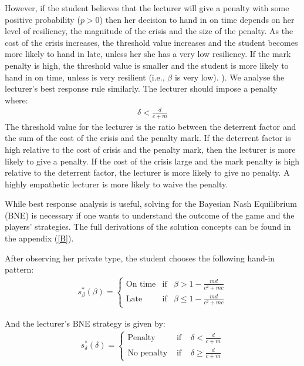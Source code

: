 \documentclass[11pt,preprint, authoryear]{elsarticle}
\numberwithin{equation}{section}
\numberwithin{figure}{section}
\numberwithin{table}{section}
\begin{document}
However, if the student believes that the lecturer will give a penalty
with some positive probability (\(p>0\)) then her decision to hand in on
time depends on her level of resiliency, the magnitude of the crisis and
the size of the penalty. As the cost of the crisis increases, the
threshold value increases and the student becomes more likely to hand in
late, unless her she has a very low resiliency. If the mark penalty is
high, the threshold value is smaller and the student is more likely to
hand in on time, unless is very resilient (i.e., \(\beta\) is very low).
). We analyse the lecturer's best response rule similarly. The lecturer
should impose a penalty where: \begin{align*}
\delta<\frac{d}{c+m}
\end{align*} The threshold value for the lecturer is the ratio between
the deterrent factor and the sum of the cost of the crisis and the
penalty mark. If the deterrent factor is high relative to the cost of
crisis and the penalty mark, then the lecturer is more likely to give a
penalty. If the cost of the crisis large and the mark penalty is high
relative to the deterrent factor, the lecturer is more likely to give no
penalty. A highly empathetic lecturer is more likely to waive the
penalty.

While best response analysis is useful, solving for the Bayesian Nash
Equilibrium (BNE) is necessary if one wants to understand the outcome of
the game and the players' strategies. The full derivations of the
solution concepts can be found in the appendix (\ref{B}).

After observing her private type, the student chooses the following
hand-in pattern:\\
\begin{align*}
s_{\beta}^{*}(\beta)=\left\{\begin{array}{lll}
\text{On time} & \text{if} & \beta>1-\frac{m d}{c^{2}+m c}  \\
\text{Late} & \text{if} & \beta \leq 1-\frac{m d}{c^{2}+m c} 
\end{array}\right.
\end{align*}

And the lecturer's BNE strategy is given by: \begin{align*}
s_{\delta}^{*}(\delta)=\left\{\begin{array}{lll}
\text{Penalty} & \text { if } & \delta<\frac{d}{c+m} \\
\text{No penalty} & \text { if } & \delta \geq \frac{d}{c+m}
\end{array}\right.
\end{align*}
\end{document}
